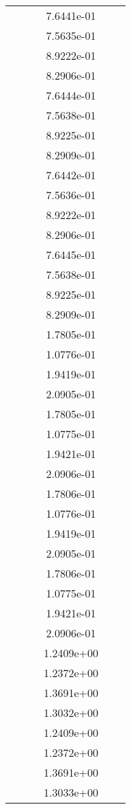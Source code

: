 \begin{xltabular}{\textwidth}{r|rS[table-format=1.3e+2]S[table-format=1.4e+2]S[table-format=1.4e+2]S[table-format=-1.5]}
&  &  & 7.6441e-01 & & \\
&  &  & 7.5635e-01 & & \\
&  &  & 8.9222e-01 & & \\
&  &  & 8.2906e-01 & & \\
&  &  & 7.6444e-01 & & \\
&  &  & 7.5638e-01 & & \\
&  &  & 8.9225e-01 & & \\
&  &  & 8.2909e-01 & & \\
&  &  & 7.6442e-01 & & \\
&  &  & 7.5636e-01 & & \\
&  &  & 8.9222e-01 & & \\
&  &  & 8.2906e-01 & & \\
&  &  & 7.6445e-01 & & \\
&  &  & 7.5638e-01 & & \\
&  &  & 8.9225e-01 & & \\
&  &  & 8.2909e-01 & & \\
&  &  & 1.7805e-01 & & \\
&  &  & 1.0776e-01 & & \\
&  &  & 1.9419e-01 & & \\
&  &  & 2.0905e-01 & & \\
&  &  & 1.7805e-01 & & \\
&  &  & 1.0775e-01 & & \\
&  &  & 1.9421e-01 & & \\
&  &  & 2.0906e-01 & & \\
&  &  & 1.7806e-01 & & \\
&  &  & 1.0776e-01 & & \\
&  &  & 1.9419e-01 & & \\
&  &  & 2.0905e-01 & & \\
&  &  & 1.7806e-01 & & \\
&  &  & 1.0775e-01 & & \\
&  &  & 1.9421e-01 & & \\
&  &  & 2.0906e-01 & & \\
&  &  & 1.2409e+00 & & \\
&  &  & 1.2372e+00 & & \\
&  &  & 1.3691e+00 & & \\
&  &  & 1.3032e+00 & & \\
&  &  & 1.2409e+00 & & \\
&  &  & 1.2372e+00 & & \\
&  &  & 1.3691e+00 & & \\
&  &  & 1.3033e+00 & & \\

\end{xltabular}

